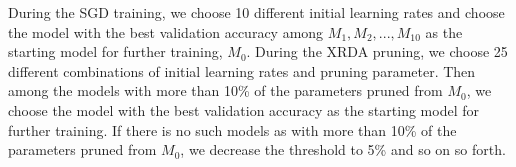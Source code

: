 During the SGD training, we choose 10 different initial learning rates and choose the model with the best validation accuracy among $M_1, M_2,...,M_{10}$ as the starting model for further training, $M_0$.
During the XRDA pruning, we choose 25 different combinations of initial learning rates and pruning parameter. Then  among the models with more than 10\% of the parameters pruned from $M_0$,  we choose the model with the best validation accuracy as the starting model  for further training. If there is no such models as with more than 10\% of the parameters pruned from $M_0$, we decrease the threshold to 5\% and so on so forth. 

%
%


